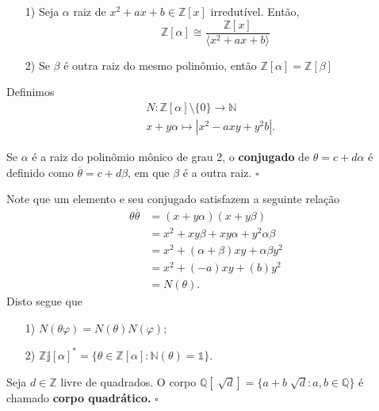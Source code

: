 \documentclass[algebraII_notes.tex]{subfiles}
\begin{document}
\begin{example}[Exercícios]
	\begin{itemize}
		\item[1)] Seja \(\alpha \) raiz de \(x^{2} + ax + b\in \mathbb{Z}[x]\) irredutível. Então,
		      \[
			      \mathbb{Z}[\alpha ] \cong{\frac{\mathbb{Z}[x]}{\langle x^{2} + ax + b \rangle}}
		      \]
		\item[2)] Se \(\beta \) é outra raiz do mesmo polinômio, então \(\mathbb{Z}[\alpha ] = \mathbb{Z}[\beta ]\)
	\end{itemize}
\end{example}
Definimos
\begin{align*}
	 & N:\mathbb{Z}[\alpha ]\setminus{\{0\}}\rightarrow \mathbb{N} \\
	 & x+y\alpha \mapsto |x^{2} - axy + y^{2}b|.
\end{align*}
\begin{def*}
	Se \(\alpha \) é a raiz do polinômio mônico de grau 2, o \textbf{conjugado} de \(\theta = c+d\alpha \) é definido como \(\overline{\theta } = c + d\beta \), em que \(\beta \) é a outra raiz. \(\square\)
\end{def*}
Note que um elemento e seu conjugado satisfazem a seguinte relação
\begin{align*}
	\theta \overline{\theta } & = (x+y\alpha )(x+y\beta)                           \\
	                          & = x^{2} + xy\beta  + xy\alpha  + y^{2}\alpha \beta \\
	                          & = x^{2} + (\alpha +\beta )xy + \alpha \beta y^{2}  \\
	                          & = x^{2} + (-a)xy + (b)y^{2}                        \\
	                          & = N(\theta).
\end{align*}
Disto segue que
\begin{itemize}
	\item[1)] \(N(\theta \varphi )=N(\theta )N(\varphi )\);
	\item[2)] \(\mathbb{Zj[\alpha ]^{*} = \{\theta \in \mathbb{Z}[\alpha ]: N(\theta ) = 1\}}\).
\end{itemize}
\begin{def*}
	Seja \(d\in \mathbb{Z}\) livre de quadrados. O corpo \(\mathbb{Q}[\sqrt[]{d}] = \{a + b\sqrt[]{d}: a, b\in \mathbb{Q}\}\) é
	chamado \textbf{corpo quadrático.} \(\square\)
\end{def*}
\end{document}
